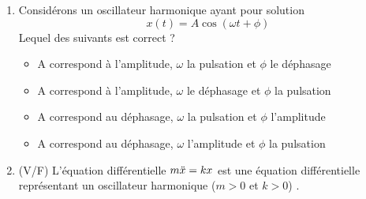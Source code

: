 \documentclass{article}
\begin{document}
\begin{enumerate}
\begin{itemize}
    \end{itemize}
    
    

    
    \item Considérons un oscillateur harmonique ayant pour solution \[x(t) = A \cos{(\omega t + \phi)} \]
    Lequel des suivants est correct ? 
    \begin{itemize}
        \item A correspond à l'amplitude, $\omega$ la pulsation et $\phi$ le déphasage %
        \item A correspond à l'amplitude, $\omega$ le déphasage  et $\phi$ la pulsation
        \item A correspond au déphasage, $\omega$ la pulsation et $\phi$ l'amplitude
        \item A correspond au déphasage, $\omega$ l'amplitude et $\phi$ la pulsation
    \end{itemize}
    
    \item (V/F) L'équation différentielle $m \Ddot{x} = kx$ est une équation différentielle représentant un oscillateur harmonique ($m > 0$ et $k > 0$) .
\end{enumerate}
\end{document}
